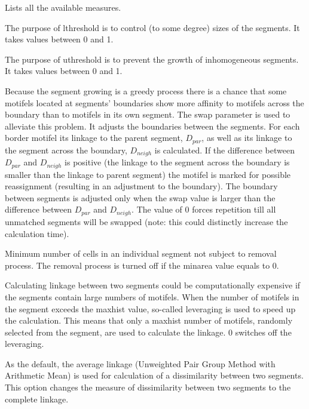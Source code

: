 
Lists all the available measures. 


The purpose of lthreshold is to control (to some degree) sizes of the segments. 
It takes values between 0 and 1.


The purpose of uthreshold is to prevent the growth of inhomogeneous segments.
It takes values between 0 and 1.


Because the segment growing is a greedy process there is a chance that some motifels located at segments’ boundaries show more affinity to motifels across the boundary than to motifels in its own segment.
The swap parameter is used to alleviate this problem.
It adjusts the boundaries between the segments.
For each border motifel its linkage to the parent segment, $D_{par}$, as well as its linkage to the segment across the boundary, $D_{neigh}$ is calculated.
If the difference between $D_{par}$ and $D_{neigh}$ is positive (the linkage to the segment across the boundary is smaller than the linkage to parent segment) the motifel is marked for possible reassignment (resulting in an adjustment to the boundary).
The boundary between segments is adjusted only when the swap value is larger than the difference between $D_{par}$ and $D_{neigh}$. 
The value of 0 forces repetition till all unmatched segments will be swapped (note: this could distinctly increase the calculation time).


Minimum number of cells in an individual segment not subject to removal process. 
The removal process is turned off if the minarea value equals to 0.


Calculating linkage between two segments could be computationally expensive if the segments contain large numbers of motifels.
When the number of motifels in the segment exceeds the maxhist value, so-called leveraging is used to speed up the calculation.
This means that only a maxhist number of motifels, randomly selected from the segment, are used to calculate the linkage.
0 switches off the leveraging.


As the default, the average linkage (Unweighted Pair Group Method with Arithmetic Mean) is used for calculation of a dissimilarity between two segments. 
This option changes the measure of dissimilarity between two segments to the complete linkage.

